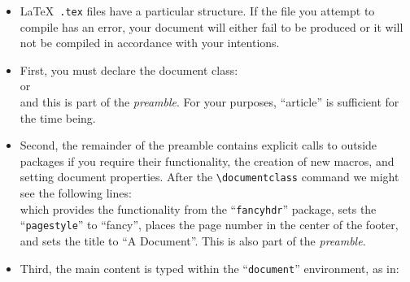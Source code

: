 \begin{itemize}

\item \par \LaTeX~\texttt{.tex} files have a particular structure. If the file you attempt to
  compile has an error, your document will either fail to be produced or
  it will not be compiled in accordance with your intentions.

\item \par First, you must declare the document class: \\
  or \\
  and this is part of the \textit{preamble}. For your purposes,
  ``article'' is sufficient for the time being.

\item \par Second, the remainder of the preamble contains explicit calls to
  outside packages if you require their functionality, the creation of
  new macros, and setting document properties. After the
  \texttt{\textbackslash documentclass} command we might see the
  following lines:\\
   which provides the functionality from the ``\texttt{fancyhdr}''
  package, sets the ``\texttt{pagestyle}'' to ``fancy'', places the page
  number in the center of the footer, and sets the title to ``A
  Document''. This is also part of the \textit{preamble}.

\item Third, the main content is typed within the ``\texttt{document}''
  environment, as in:\\
  \noindent \ovalbox{
    \begin{minipage}{\linewidth}
\begin{verbatim}



\end{verbatim}
\end{minipage}}
\end{itemize}
